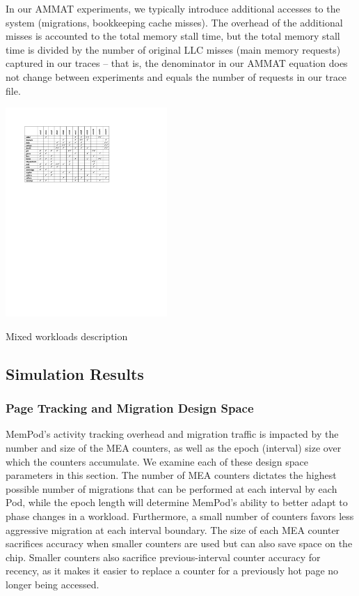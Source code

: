 In our AMMAT experiments, we typically introduce additional accesses to the
system (migrations, bookkeeping cache misses).  The overhead of the additional
misses is accounted to the total memory stall time, but the total memory 
stall time is divided by the number of original LLC misses (main memory requests) captured in our traces
-- that is, the denominator in our AMMAT equation does not change between
experiments and equals the number of requests in our trace file.

\begin{table}
  \includegraphics[width=0.46\textwidth]{figures/workloads_checkmarks.pdf}
  \caption{Mixed workloads description}
  \label{tab:workloads}
\end{table}

\subsection{Simulation Results}
\label{sub:SimResults}

\subsubsection{Page Tracking and Migration Design Space}

MemPod's activity tracking overhead and migration traffic is impacted by
the number and size of the MEA counters, as well as the epoch (interval) 
size over
which the counters accumulate.  We examine each of these design space
parameters in this section.
The number of MEA counters dictates the highest possible number of 
migrations that can be performed at each interval by each Pod, while the epoch length will determine MemPod's ability to better adapt to phase changes in a workload. Furthermore, a small number of counters favors less aggressive
migration at each interval boundary.
The size of each MEA counter sacrifices accuracy when smaller counters are 
used 
but can also save space on the chip.  Smaller counters also sacrifice
previous-interval counter accuracy for recency, as it makes it easier to
replace a counter for a previously hot page no longer being accessed.

